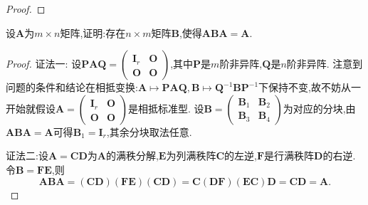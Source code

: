 \documentclass[../../main.tex]{subfiles}%
\begin{document}
\begin{proof}

\end{proof}

\begin{example}\label{example:3.26111}
设\(\boldsymbol{A}\)为\(m\times n\)矩阵,证明:存在\(n\times m\)矩阵\(\boldsymbol{B}\),使得\(\boldsymbol{A}\boldsymbol{B}\boldsymbol{A}=\boldsymbol{A}\).
\end{example}
\begin{proof}

{\color{blue}证法一:}
设\(\boldsymbol{P}\boldsymbol{A}\boldsymbol{Q}=\begin{pmatrix}
\boldsymbol{I}_r&\boldsymbol{O}\\
\boldsymbol{O}&\boldsymbol{O}
\end{pmatrix}\),其中\(\boldsymbol{P}\)是\(m\)阶非异阵,\(\boldsymbol{Q}\)是\(n\)阶非异阵. 注意到问题的条件和结论在相抵变换:\(\boldsymbol{A}\mapsto\boldsymbol{P}\boldsymbol{A}\boldsymbol{Q},\boldsymbol{B}\mapsto\boldsymbol{Q}^{-1}\boldsymbol{B}\boldsymbol{P}^{-1}\)下保持不变,故不妨从一开始就假设\(\boldsymbol{A}=\begin{pmatrix}
\boldsymbol{I}_r&\boldsymbol{O}\\
\boldsymbol{O}&\boldsymbol{O}
\end{pmatrix}\)是相抵标准型. 设\(\boldsymbol{B}=\begin{pmatrix}
\boldsymbol{B}_1&\boldsymbol{B}_2\\
\boldsymbol{B}_3&\boldsymbol{B}_4
\end{pmatrix}\)为对应的分块,由\(\boldsymbol{A}\boldsymbol{B}\boldsymbol{A}=\boldsymbol{A}\)可得\(\boldsymbol{B}_1=\boldsymbol{I}_r\),其余分块取法任意.

{\color{blue}证法二:}设\(\boldsymbol{A}=\boldsymbol{C}\boldsymbol{D}\)为\(\boldsymbol{A}\)的满秩分解,\(\boldsymbol{E}\)为列满秩阵\(\boldsymbol{C}\)的左逆,\(\boldsymbol{F}\)是行满秩阵\(\boldsymbol{D}\)的右逆. 令\(\boldsymbol{B}=\boldsymbol{F}\boldsymbol{E}\),则
\[
\boldsymbol{A}\boldsymbol{B}\boldsymbol{A}=(\boldsymbol{C}\boldsymbol{D})(\boldsymbol{F}\boldsymbol{E})(\boldsymbol{C}\boldsymbol{D})=\boldsymbol{C}(\boldsymbol{D}\boldsymbol{F})(\boldsymbol{E}\boldsymbol{C})\boldsymbol{D}=\boldsymbol{C}\boldsymbol{D}=\boldsymbol{A}.
\]
\end{proof}
\end{document}
